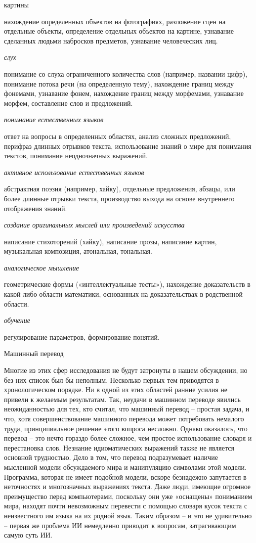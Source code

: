 \documentclass[../main.tex]{subfiles}
\begin{document}
картины

нахождение определенных объектов на фотографиях, разложение сцен на отдельные объекты, определение отдельных объектов на картине, узнавание сделанных людьми набросков предметов, узнавание человеческих лиц.

\emph{слух}

понимание со слуха ограниченного количества слов (например, названии цифр), понимание потока речи (на определенную тему), нахождение границ между фонемами, узнавание фонем, нахождение границ между морфемами, узнавание морфем, составление слов и предложений.

\emph{понимание естественных языков}

ответ на вопросы в определенных областях, анализ сложных предложений, перифраз длинных отрывков текста, использование знаний о мире для понимания текстов, понимание неоднозначных выражений.

\emph{активное использование естественных языков}

абстрактная поэзия (например, хайку), отдельные предложения, абзацы, или более длинные отрывки текста, производство выхода на основе внутреннего отображения знаний.

\emph{создание оригинальных мыслей или произведений искусства}

написание стихоторений (хайку), написание прозы, написание картин, музыкальная композиция, атональная, тональная.

\emph{аналогическое мышление}

геометрические формы («интеллектуальные тесты»), нахождение доказательств в какой-либо области математики, основанных на доказательствах в родственной области.

\emph{обучение}

регулирование параметров, формирование понятий.

Машинный перевод

Многие из этих сфер исследования не будут затронуты в нашем обсуждении, но без них список был бы неполным. Несколько первых тем приводятся в хронологическом порядке. Ни в одной из этих областей ранние усилия не привели к желаемым результатам. Так, неудачи в машинном переводе явились неожиданностью для тех, кто считал, что машинный перевод \--- простая задача, и что, хотя совершенствование машинного перевода может потребовать немалого труда, принципиальное решение этого вопроса несложно. Однако оказалось, что перевод \--- это нечто гораздо более сложное, чем простое использование словаря и перестановка слов. Незнание идиоматических выражений также не является основной трудностью. Дело в том, что перевод подразумевает наличие мысленной модели обсуждаемого мира и манипуляцию символами этой модели. Программа, которая не имеет подобной модели, вскоре безнадежно запутается в неточностях и многозначных выражениях текста. Даже люди, имеющие огромное преимущество перед компьютерами, поскольку они уже «оснащены» пониманием мира, находят почти невозможным перевести с помощью словаря кусок текста с неизвестного им языка на их родной язык. Таким образом \--- и это не удивительно \--- первая же проблема ИИ немедленно приводит к вопросам, затрагивающим самую суть ИИ.
\end{document}
